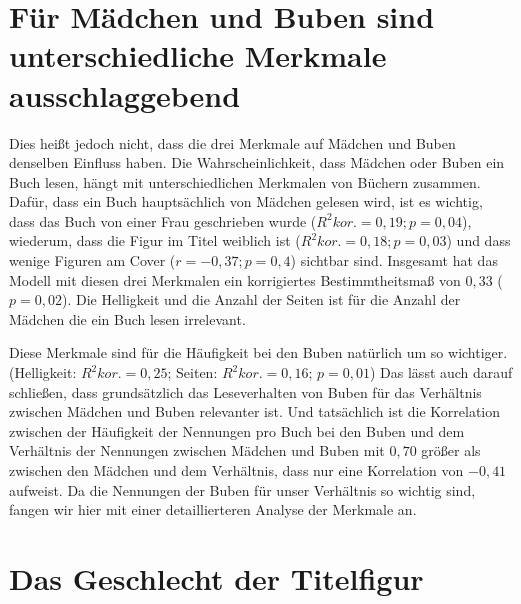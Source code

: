 

\section{Für Mädchen und Buben sind unterschiedliche Merkmale
ausschlaggebend}

Dies heißt jedoch nicht, dass die drei Merkmale auf Mädchen und Buben
denselben Einfluss haben. Die Wahrscheinlichkeit, dass Mädchen oder
Buben ein Buch lesen, hängt mit unterschiedlichen Merkmalen von Büchern
zusammen. Dafür, dass ein Buch hauptsächlich von Mädchen gelesen wird,
ist es wichtig, dass das Buch von einer Frau geschrieben wurde
($R^2 \scriptstyle kor.\textstyle =0{,}19; p=0{,}04$), wiederum, dass
die Figur im Titel weiblich ist
($R^{2}\scriptstyle kor.\textstyle =0{,}18; p=0{,}03$) und dass wenige
Figuren am Cover ($r=-0{,}37; p=0{,}4$) sichtbar sind. Insgesamt hat das
Modell mit diesen drei Merkmalen ein korrigiertes Bestimmtheitsmaß von
$0{,}33$ ($p=0{,}02$). Die Helligkeit und die Anzahl der Seiten ist für
die Anzahl der Mädchen die ein Buch lesen irrelevant.

Diese Merkmale sind für die Häufigkeit bei den Buben natürlich um so
wichtiger. (Helligkeit: $R^2 \scriptstyle kor.\textstyle =0{,}25$;
Seiten: $R^2 \scriptstyle kor.\textstyle =0{,}16$; $p=0{,}01$) Das lässt
auch darauf schließen, dass grundsätzlich das Leseverhalten von Buben
für das Verhältnis zwischen Mädchen und Buben relevanter ist. Und
tatsächlich ist die Korrelation zwischen der Häufigkeit der Nennungen
pro Buch bei den Buben und dem Verhältnis der Nennungen zwischen Mädchen
und Buben mit $0{,}70$ größer als zwischen den Mädchen und dem
Verhältnis, dass nur eine Korrelation von $-0{,}41$ aufweist. Da die
Nennungen der Buben für unser Verhältnis so wichtig sind, fangen wir
hier mit einer detaillierteren Analyse der Merkmale an.

\section{Das Geschlecht der Titelfigur}

